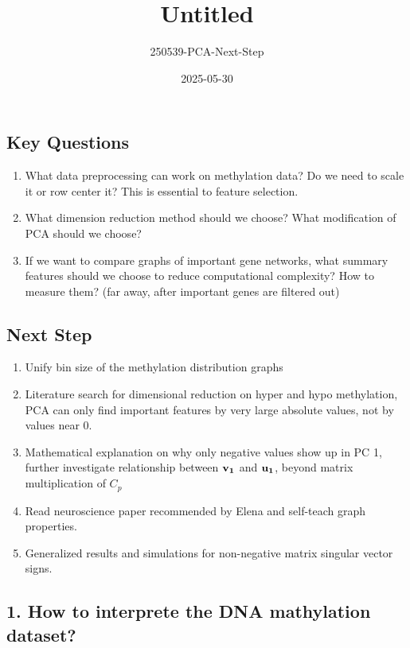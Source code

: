 \documentclass[
]{article}
\title{Untitled}
\author{250539-PCA-Next-Step}
\date{2025-05-30}
\providecommand{\tightlist}{%
  \setlength{\itemsep}{0pt}\setlength{\parskip}{0pt}}
\begin{document}
\maketitle

\subsection{Key Questions}\label{key-questions}

\begin{enumerate}
\def\labelenumi{\arabic{enumi}.}
\tightlist
\item
  What data preprocessing can work on methylation data? Do we need to
  scale it or row center it? This is essential to feature selection.
\item
  What dimension reduction method should we choose? What modification of
  PCA should we choose?
\item
  If we want to compare graphs of important gene networks, what summary
  features should we choose to reduce computational complexity? How to
  measure them? (far away, after important genes are filtered out)
\end{enumerate}

\subsection{Next Step}\label{next-step}

\begin{enumerate}
\def\labelenumi{\arabic{enumi}.}
\tightlist
\item
  Unify bin size of the methylation distribution graphs
\item
  Literature search for dimensional reduction on hyper and hypo
  methylation, PCA can only find important features by very large
  absolute values, not by values near 0.
\item
  Mathematical explanation on why only negative values show up in PC 1,
  further investigate relationship between \(\bf v_1\) and \(\bf u_1\),
  beyond matrix multiplication of \(C_p\)
\item
  Read neuroscience paper recommended by Elena and self-teach graph
  properties.
\item
  Generalized results and simulations for non-negative matrix singular
  vector signs.
\end{enumerate}

\subsection{1. How to interprete the DNA mathylation
dataset?}\label{how-to-interprete-the-dna-mathylation-dataset}
\end{document}
